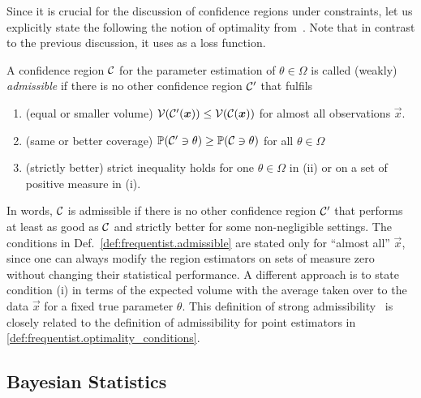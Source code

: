 Since it is crucial for the discussion of confidence regions under constraints, let us explicitly state the following the notion of optimality from~\cite[Def. 2.2]{Joshi_1969_Admissibility}.
Note that in contrast to the previous discussion, it uses  as a loss function.
\begin{definition}
  \label{def:frequentist.admissible}
  A confidence region $\mathcal{C}$ for the parameter estimation of $\theta \in \Omega$ is called (weakly) \emph{admissible} if there is no other confidence region $\mathcal{C}'$ that fulfils
  \begin{enumerate}
    \item(equal or smaller volume) $\mathcal{V}(\mathcal{C}'(\boldsymbol{x})) \le \mathcal{V}(\mathcal{C}(\boldsymbol{x}))$ for almost all observations $\vec x$.
    \item(same or better coverage) $\mathbb{P}(\mathcal{C}' \owns \theta) \ge \mathbb{P}(\mathcal{C} \owns \theta)$ for all $\theta \in \Omega$
    \item(strictly better) strict inequality holds for one $\theta \in \Omega$ in (ii) or on a set of positive measure in (i).
  \end{enumerate}
\end{definition}
In words, $\mathcal{C}$ is admissible if there is no other confidence region $\mathcal{C}'$ that performs at least as good as $\mathcal{C}$ and strictly better for some non-negligible settings.
The conditions in Def.~\ref{def:frequentist.admissible} are stated only for ``almost all'' $\vec x$, since one can always modify the region estimators on sets of measure zero without changing their statistical performance.
A different approach is to state condition (i) in terms of the expected volume with the average taken over to the data $\vec x$ for a fixed true parameter $\theta$.
This definition of strong admissibility~\cite[Def.~7.1]{Joshi_1969_Admissibility} is closely related to the definition of admissibility for point estimators in \cref{def:frequentist.optimality_conditions}.




\subsection{Bayesian Statistics}
\label{sub:intro.bayesian}



